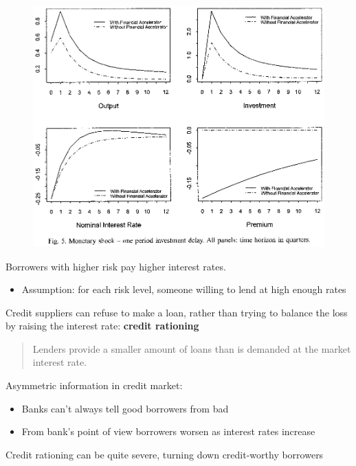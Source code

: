 \documentclass{beamer}
\begin{document}
\begin{frame}
 \begin{figure}
   \includegraphics{bernanke3.eps}
 \end{figure}  
\end{frame}

\begin{frame}
Borrowers with higher risk pay higher interest rates.
\begin{itemize}
  \item Assumption: for each risk level, someone willing to lend at high enough rates  
\end{itemize}
 Credit suppliers can refuse to make a loan, rather than trying to balance the loss by raising the interest rate: \textbf{credit rationing}
\begin{quote}
  Lenders provide a smaller amount of loans than is demanded at the market interest rate.
\end{quote}
\end{frame}

\begin{frame}
 Asymmetric information in credit market:
\begin{itemize}
  \item Banks can't always tell good borrowers from bad
  \item From bank's point of view borrowers worsen as interest rates increase
\end{itemize}
  \medskip
  Credit rationing can be quite severe, turning down credit-worthy borrowers
\end{frame}
\end{document}
